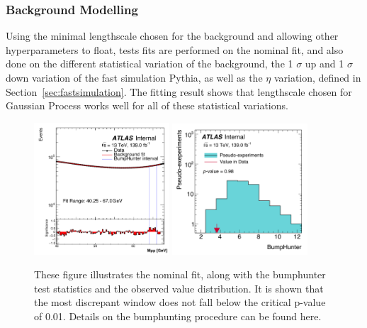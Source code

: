 \subsubsection{Background Modelling}
Using the minimal lengthscale chosen for the background and allowing other hyperparameters to float, tests fits are performed on the nominal fit, and also done on the different statistical variation of the background, the 1 $\sigma$ up and 1 $\sigma$ down variation of the fast simulation Pythia, as well as the $\eta$ variation, defined in Section~\ref{sec:fastsimulation}.
The fitting result shows that lengthscale chosen for Gaussian Process works well for all of these statistical variations. 

\begin{figure}[!htb]
    \begin{center}
        \includegraphics[width=0.45\textwidth]{figures/chapter_dimuon/Nominal}        
        \includegraphics[width=0.45\textwidth]{figures/chapter_dimuon/NominalBH}        
        \caption{
        These figure illustrates the nominal fit, along with the bumphunter test statistics and the observed value distribution. It is shown that the most discrepant window does not fall below the critical p-value of 0.01. Details on the bumphunting procedure can be found here. 
        }
        \label{fig:bumphunterstats}
    \end{center}
\end{figure}
\FloatBarrier


